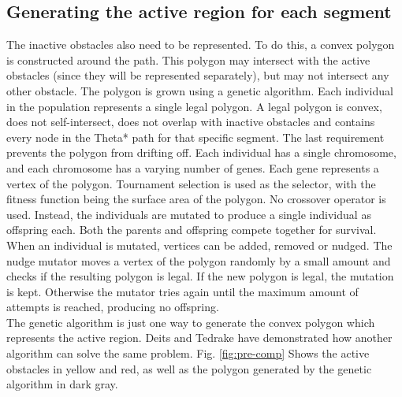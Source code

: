 \subsection{Generating the active region for each segment}
The inactive obstacles also need to be represented. To do this, a convex polygon is constructed around the path. This polygon may intersect with the active obstacles (since they will be represented separately), but may not intersect any other obstacle. The polygon is grown using a genetic algorithm. Each individual in the population represents a single legal polygon. A legal polygon is convex, does not self-intersect, does not overlap with inactive obstacles and contains every node in the Theta* path for that specific segment. The last requirement prevents the polygon from drifting off. Each individual has a single chromosome, and each chromosome has a varying number of genes. Each gene represents a vertex of the polygon. Tournament selection is used as the selector, with the fitness function being the surface area of the polygon. No crossover operator is used. Instead, the individuals are mutated to produce a single individual as offspring each. Both the parents and offspring compete together for survival. \\
When an individual is mutated, vertices can be added, removed or nudged. The nudge mutator moves a vertex of the polygon randomly by a small amount and checks if the resulting polygon is legal. If the new polygon is legal, the mutation is kept. Otherwise the mutator tries again until the maximum amount of attempts is reached, producing no offspring. \\
The genetic algorithm is just one way to generate the convex polygon which represents the active region. Deits and Tedrake \cite{Deits2015} have demonstrated how another algorithm can solve the same problem. Fig. \ref{fig:pre-comp} Shows the active obstacles in yellow and red, as well as the polygon generated by the genetic algorithm in dark gray.

